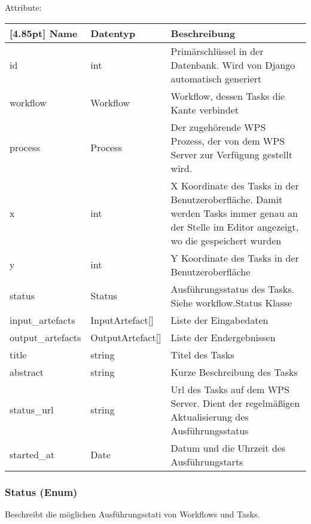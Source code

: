     		Attribute:
			\begin{center}
				\setlength\tabcolsep{5pt}
				\renewcommand{\arraystretch}{1.5}
				
				\begin{tabularx}{\textwidth}{|l|l|X|}
					\hline
					\rowcolor[gray]{0.75}[4.85pt]
					Name & Datentyp & Beschreibung \\ \hline 
	           		id & int & Primärschlüssel in der Datenbank. Wird von Django automatisch generiert \\ \hline
	           		workflow & Workflow & Workflow, dessen Tasks die Kante verbindet \\ \hline
	           		process & Process & Der zugehörende WPS Prozess, der von dem WPS Server zur Verfügung gestellt wird. \\\hline
	           		x & int & X Koordinate des Tasks in der Benutzeroberfläche. Damit werden Tasks immer genau an der Stelle im Editor angezeigt, wo die gespeichert wurden\\ \hline
	           		y & int & Y Koordinate des Tasks in der Benutzeroberfläche\\ \hline
	           		status & Status & Ausführungsstatus des Tasks. Siehe workflow.Status Klasse \\ \hline
	           		input\_artefacts & InputArtefact[] & Liste der Eingabedaten \\ \hline
	           		output\_artefacts & OutputArtefact[] & Liste der Endergebnissen \\ \hline
	           		title & string & Titel des Tasks \\ \hline
	           		abstract & string & Kurze Beschreibung des Tasks \\ \hline
	           		status\_url & string & Url des Tasks auf dem WPS Server. Dient der  regelmäßigen Aktualisierung des Ausführungsstatus \\ \hline
	           		started\_at & Date & Datum und die Uhrzeit des Ausführungstarts \\ \hline
				\end{tabularx}
			\end{center}			
		\subsubsection{Status (Enum)}	
			Beschreibt die möglichen Ausführungsstati von Workflows und Tasks. \newline
			
